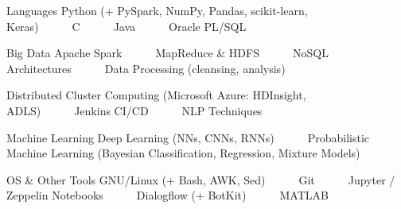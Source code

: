 

\begin{cvskills}

  \cvskill
    {Languages} %
    {Python (+ PySpark, NumPy, Pandas, scikit-learn, Keras)~~~\textbullet~~~C~~~\textbullet~~~Java~~~\textbullet~~~Oracle PL/SQL} %

  \cvskill
    {Big Data} %
    {Apache Spark~~~\textbullet~~~MapReduce \& HDFS~~~\textbullet~~~NoSQL Architectures~~~\textbullet~~~Data Processing (cleansing, analysis)~~~\textbullet~~~} %
    
\cvskill
    {} %
    {Distributed Cluster Computing (Microsoft Azure: HDInsight, ADLS)~~~\textbullet~~~Jenkins CI/CD~~~\textbullet~~~NLP Techniques} %

  \cvskill
    {Machine Learning} %
    {Deep Learning (NNs, CNNs, RNNs)~~~\textbullet~~~Probabilistic Machine Learning (Bayesian Classification, Regression, Mixture Models)} %

  \cvskill
    {OS \& Other Tools} %
    {GNU/Linux (+ Bash, AWK, Sed)~~~\textbullet~~~Git~~~\textbullet~~~Jupyter / Zeppelin Notebooks~~~\textbullet~~~Dialogflow (+ BotKit)~~~\textbullet~~~MATLAB} %

\end{cvskills}
